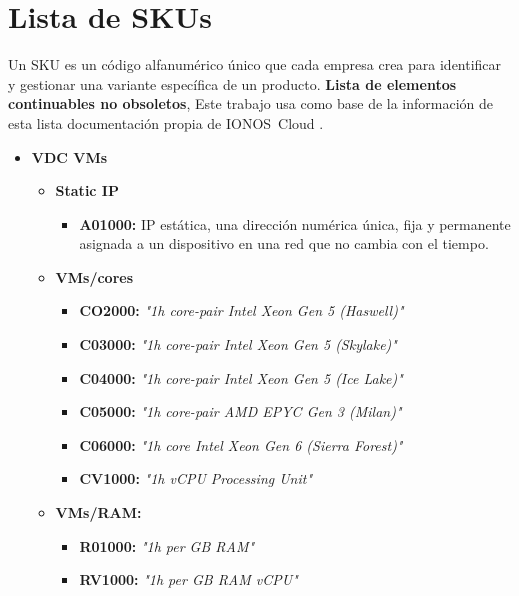 
\chapter{Lista de SKUs}
Un SKU es un código alfanumérico único que cada empresa crea para identificar y gestionar una variante específica de un producto.
\label{anexo:Lista-de-SKUs}
\textbf{Lista de elementos continuables no obsoletos}, Este trabajo usa como base de la información de esta lista documentación propia de IONOS~Cloud \cite{billing-IONOSCloud}.
\begin{itemize}
    \item \textbf{VDC VMs}\begin{itemize}
              \item \textbf{Static IP }\begin{itemize}
                        \item \textbf{A01000: } IP estática, una dirección numérica única, fija y permanente asignada a un dispositivo en una red que no cambia con el tiempo.
                    \end{itemize}
              \item \textbf{VMs/cores} \begin{itemize}
                        \item \textbf{CO2000: } \textit{"1h core-pair Intel Xeon Gen 5 (Haswell)"}
                        \item \textbf{C03000: } \textit{"1h core-pair Intel Xeon Gen 5 (Skylake)"}
                        \item \textbf{C04000: } \textit{"1h core-pair Intel Xeon Gen 5 (Ice Lake)"}
                        \item \textbf{C05000: } \textit{"1h core-pair AMD EPYC Gen 3 (Milan)"}
                        \item \textbf{C06000: } \textit{"1h core Intel Xeon Gen 6 (Sierra Forest)"}
                        \item \textbf{CV1000: } \textit{"1h vCPU Processing Unit"}
                    \end{itemize}
              \item \textbf{VMs/RAM: } \begin{itemize}
                        \item \textbf{ R01000: } \textit{"1h per GB RAM"}
                        \item \textbf{ RV1000: } \textit{"1h per GB RAM vCPU"}

\end{itemize}
\end{itemize}
\end{itemize}
